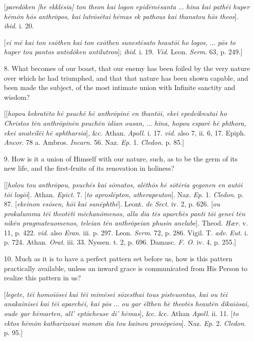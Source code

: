 [\emph{pared\={o}ken [he ekkl\={e}sia] ton theon kai logon epid\={e}m\={e}santa}
... \emph{hina kai path\={e}i huper h\={e}m\={o}n h\={o}s
anthr\={o}pos, kai lutr\={o}s\={e}tai h\={e}mas ek pathous
kai thanatou h\={o}s theos}]. \emph{ibid}. i. 20.

[\emph{ei m\={e} kai ton es\={o}then kai ton ex\={o}then
sunest\={e}sato heaut\={o}i ho logos,} ... \emph{p\={o}s to
huper tou pantos anted\={o}ken antilutron}]; \emph{ibid}. i. 19.
\emph{Vid}. Leon. \emph{Serm}. 63, p. 249.]

8. What becomes of our boast, that our enemy has been foiled by the
very nature over which he had triumphed, and that that nature has been
shown capable, and been made the subject, of the most intimate union
with Infinite sanctity and wisdom?

[[\emph{hopou kekrat\={e}to h\={e} psuch\={e} h\={e} anthr\={o}pin\={e}
en thant\={o}i, ekei epedeiknutai ho Christos t\={e}n anthr\={o}pin\={e}n
psuch\={e}n idian ousan}, ... \emph{hina, hopou espar\={e} h\={e}
phthora, ekei anateil\={e}i h\={e} aphtharsia}], \&c.
Athan. \emph{Apoll}. i. 17. \emph{vid}. also 7, ii. 6, 17. Epiph. \emph{Ancor}.
78 a. Ambros. \emph{Incarn}. 56. Naz. \emph{Ep}. 1. \emph{Cledon}. p.
85.]

9. How is it a union of Himself with our nature, such, as to be the
germ of its new life, and the first-fruits of its renovation in
holiness?

[[\emph{holou tou anthr\={o}pou, psuch\={e}s kai s\={o}matos,
al\={e}th\={o}s h\={e} s\={o}t\={e}ria gegonen en aut\={o}i
t\={o}i log\={o}i}]. Athan. \emph{Epict}. 7. [\emph{to aprosl\={e}pton,
atherapeuton}]. Naz. \emph{Ep}. 1. \emph{Cledon}. p. 87. [\emph{ekeinon
es\={o}sen, h\={o}i kai sun\={e}phth\={e}}]. Leont. \emph{de
Sect}. iv. 2, p. 626. [\emph{ou prokalumma t\={e}i theot\={e}ti
m\={e}chan\={o}menos, alla dia t\={e}s aparch\={e}s panti
t\={o}i genei t\={e}n nik\={e}n pragmateuomenos, teleian t\={e}n
anthr\={o}peian phusin anelabe}]. Theod. \emph{Hær}. v. 11, p.
422. \emph{vid}. also \emph{Eran}. iii. p. 297. Leon. \emph{Serm}. 72,
p. 286. Vigil. T. \emph{adv}. \emph{Eut}. i. p. 724. Athan. \emph{Orat}.
iii. 33. Nyssen. t. 2, p. 696. Damasc. \emph{F. O}. iv. 4, p. 255.]

10. Much as it is to have a perfect pattern set before us, how is
this pattern practically available, unless an inward grace is
communicated from His Person to realize this pattern in us?

[\emph{legete, t\={e}i homoi\={o}sei kai t\={e}i mim\={e}sei
s\={o}zesthai tous pisteuontas, kai ou t\={e}i anakainisei kai t\={e}i
aparch\={e}i, kai p\={o}s} ... \emph{ou gar \={e}lthen h\={e}
theot\={e}s heaut\={e}n dikai\={o}sai, oude gar h\={e}marten,
all' ept\={o}cheuse di' h\={e}mas}], \&c. \&c. Athan \emph{Apoll}.
ii. 11. [\emph{to ektos h\={e}m\={o}n katharizousi monon dia tou
kainou pros\={o}peiou}]. Naz. \emph{Ep}. 2. \emph{Cledon}. p.
95.]

